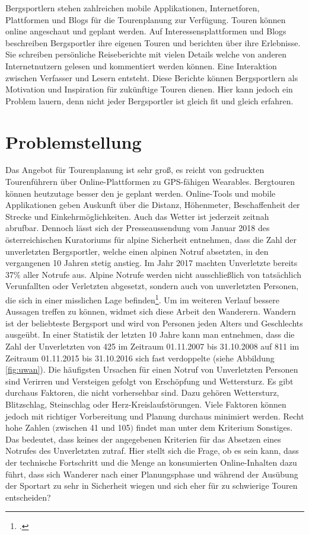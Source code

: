 Bergsportlern stehen zahlreichen mobile Applikationen, Internetforen, Plattformen und Blogs für die Tourenplanung zur Verfügung. Touren können online angeschaut und geplant werden. Auf Interessensplattformen und Blogs beschreiben Bergsportler ihre eigenen Touren und berichten über ihre  Erlebnisse. Sie schreiben persönliche Reiseberichte mit vielen Details welche von anderen Internetnutzern gelesen und kommentiert werden können. Eine Interaktion zwischen Verfasser und Lesern entsteht. Diese Berichte können Bergsportlern als Motivation und Inspiration für zukünftige Touren dienen. Hier kann jedoch ein Problem lauern, denn nicht jeder Bergsportler ist gleich fit und gleich erfahren.


\section{Problemstellung}

Das Angebot für Tourenplanung ist sehr groß, es reicht von gedruckten Tourenführern über Online-Plattformen zu GPS-fähigen Wearables. Bergtouren können heutzutage besser den je geplant werden. Online-Tools und mobile Applikationen geben Auskunft über die Distanz, Höhenmeter, Beschaffenheit der Strecke und Einkehrmöglichkeiten. Auch das Wetter ist jederzeit zeitnah abrufbar. Dennoch lässt sich der Presseaussendung vom Januar 2018 des österreichischen Kuratoriums für alpine Sicherheit entnehmen, dass die Zahl der unverletzten Bergsportler, welche einen alpinen Notruf absetzten, in den vergangenen 10 Jahren stetig anstieg. Im Jahr 2017 machten Unverletzte bereits 37\% aller Notrufe aus. Alpine Notrufe werden nicht ausschließlich von tatsächlich Verunfallten oder Verletzten abgesetzt, sondern auch von unverletzten Personen, die sich in einer misslichen Lage befinden\footcite{kurasi}.
Um im weiteren Verlauf bessere Aussagen treffen zu können, widmet sich diese Arbeit den Wanderern. Wandern ist der beliebteste Bergsport und wird von Personen jeden Alters und Geschlechts ausgeübt.
In einer Statistik der letzten 10 Jahre kann man entnehmen, dass die Zahl der Unverletzten von 425 im Zeitraum 01.11.2007 bis 31.10.2008 auf 811 im Zeitraum 01.11.2015 bis 31.10.2016 sich fast verdoppelte (siehe Abbildung \ref{fig:uwan}). Die häufigsten Ursachen für einen Notruf von Unverletzten Personen sind {\glqq Verirren und Versteigen\grqq} gefolgt von {\glqq Erschöpfung\grqq}  und {\glqq Wettersturz\grqq}. Es gibt durchaus Faktoren, die nicht vorhersehbar sind. Dazu gehören Wettersturz, Blitzschlag, Steinschlag oder Herz-Kreislaufstörungen. Viele Faktoren können jedoch mit richtiger Vorbereitung und Planung durchaus minimiert werden. Recht hohe Zahlen $($zwischen 41 und 105$)$ findet man unter dem Kriterium {\glqq Sonstiges\grqq}. Das bedeutet, dass keines der angegebenen Kriterien für das Absetzen eines Notrufes des Unverletzten zutraf. Hier stellt sich die Frage, ob es sein kann, dass der technische Fortschritt und die Menge an konsumierten Online-Inhalten dazu führt, dass sich Wanderer nach einer Planungsphase und während der Ausübung der Sportart zu sehr in Sicherheit wiegen und sich eher für zu schwierige Touren entscheiden?


